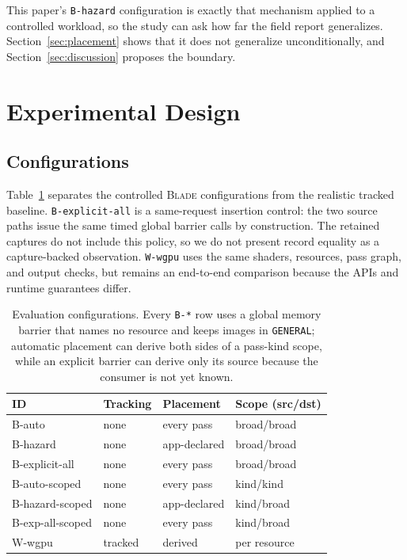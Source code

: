 \documentclass[10pt,twocolumn]{article}
\newcommand{\blade}{\textsc{Blade}}
\begin{document}
This paper's \texttt{B-hazard} configuration is exactly that mechanism applied
to a controlled workload, so the study can ask how far the field report
generalizes. Section~\ref{sec:placement} shows that it does not generalize
unconditionally, and Section~\ref{sec:discussion} proposes the boundary.

\section{Experimental Design}

\subsection{Configurations}

Table~\ref{tab:configs} separates the controlled \blade{} configurations from
the realistic tracked baseline. \texttt{B-explicit-all} is a same-request
insertion control: the two source paths issue the same timed global barrier
calls by construction. The retained captures do not include this policy, so
we do not present record equality as a capture-backed observation.
\texttt{W-wgpu} uses the same shaders, resources, pass graph, and output
checks, but remains an end-to-end comparison because the APIs and runtime
guarantees differ.

\begin{table}[t]
\centering
\small
\begin{tabular}{@{}l@{\ \ }l@{\ \ }l@{\ \ }l@{}}
\toprule
ID & Tracking & Placement & Scope (src/dst) \\
\midrule
B-auto & none & every pass & broad/broad \\
B-hazard & none & app-declared & broad/broad \\
B-explicit-all & none & every pass & broad/broad \\
\addlinespace
B-auto-scoped & none & every pass & kind/kind \\
B-hazard-scoped & none & app-declared & kind/broad \\
B-exp-all-scoped & none & every pass & kind/broad \\
\addlinespace
W-wgpu & tracked & derived & per resource \\
\bottomrule
\end{tabular}
\caption{Evaluation configurations. Every \texttt{B-*} row uses a global
memory barrier that names no resource and keeps images in \texttt{GENERAL};
automatic placement can derive both sides of a pass-kind scope, while an
explicit barrier can derive only its source because the consumer is not yet
known.}
\label{tab:configs}
\end{table}
\end{document}
